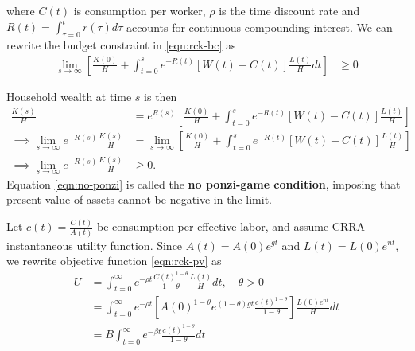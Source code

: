 \documentclass[../main.tex]{subfiles}
\begin{document}
        where $C(t)$ is consumption per worker, $\rho$ is the time discount rate and $R(t) = \int_{\tau=0}^t r(\tau) d \tau$ accounts for continuous compounding interest. We can rewrite the budget constraint in \eqref{eqn:rck-bc} as
        \begin{align}
            \lim_{s\to\infty}
            \left[\frac{K(0)}{H} + \int_{t=0}^s e^{-R(t)} \left[W(t) - C(t)\right] \frac{L(t)}{H} dt\right]
            &\ge 0
        \end{align}
        
        Household wealth at time $s$ is then
        \begin{align}
            \frac{K(s)}{H}
            &= e^{R(s)}
            \left[ \frac{K(0)}{H} + \int_{t=0}^s e^{-R(t)} \left[W(t) - C(t)\right] \frac{L(t)}{H} \right]
            \\
            \implies
            \lim_{s\to\infty} e^{-R(s)} \frac{K(s)}{H}
            &= \lim_{s\to\infty} 
            \left[ \frac{K(0)}{H} + \int_{t=0}^s e^{-R(t)} \left[W(t) - C(t)\right] \frac{L(t)}{H} \right]
            \\
            \implies
            \lim_{s\to\infty} e^{-R(s)} \frac{K(s)}{H} &\ge 0.
            \label{eqn:no-ponzi}
        \end{align}
        Equation \eqref{eqn:no-ponzi} is called the \textbf{no ponzi-game condition}, imposing that present value of assets cannot be negative in the limit.
        
        \vspace{0.5cm}
        
        Let $c(t) = \frac{C(t)}{A(t)}$ be consumption per effective labor, and assume CRRA instantaneous utility function. Since $A(t) = A(0) e^{gt}$ and $L(t) = L(0)e^{nt}$, we rewrite objective function \eqref{eqn:rck-pv} as
        \begin{align}
            U &= \int_{t=0}^\infty
            e^{-\rho t}
            \frac{C(t)^{1-\theta}}{1-\theta}
            \frac{L(t)}{H} dt,
            \quad \theta > 0
            \\
            &= \int_{t=0}^\infty
            e^{-\rho t}
            \left[A(0)^{1-\theta} e^{(1-\theta)gt}\frac{c(t)^{1-\theta}}{1-\theta}\right]
            \frac{L(0)e^{nt}}{H} dt
            \\
            &= B \int_{t=0}^\infty e^{-\beta t}
            \frac{c(t)^{1-\theta}}{1-\theta} dt
            \label{eqn:rck-pv2}
        \end{align}
\end{document}

